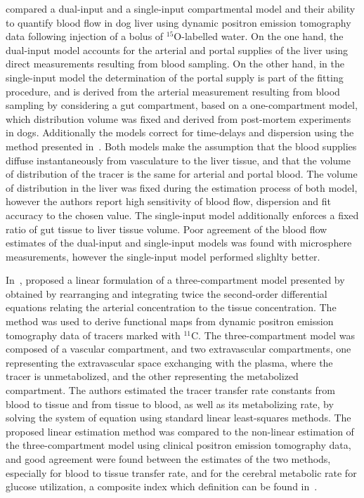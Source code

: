 \citet{Ziegler:1996cs} compared a dual-input and a single-input compartmental model and their ability to quantify blood flow in dog liver using dynamic positron emission tomography data following injection of a bolus of $^{15}$O-labelled water.
On the one hand, the dual-input model accounts for the arterial and portal supplies of the liver using direct measurements resulting from blood sampling.
On the other hand, in the single-input model the determination of the portal supply is part of the fitting procedure, and is derived from the arterial measurement resulting from blood sampling by considering a gut compartment, based on a one-compartment model, which distribution volume was fixed and derived from post-mortem experiments in dogs.
Additionally the models correct for time-delays and dispersion using the method presented in~\cite{Meyer:1989vy}.
Both models make the assumption that the blood supplies diffuse instantaneously from vasculature to the liver tissue, and that the volume of distribution of the tracer is the same for arterial and portal blood.
The volume of distribution in the liver was fixed during the estimation process of both model, however the authors report high sensitivity of blood flow, dispersion and fit accuracy to the chosen value.
The single-input model additionally enforces a fixed ratio of gut tissue to liver tissue volume.
Poor agreement of the blood flow estimates of the dual-input and single-input models was found with microsphere measurements, however the single-input model performed slighlty better.

In~\citeyear{Blomqvist:1984jy}, \citet{Blomqvist:1984jy} proposed a linear formulation of a three-compartment model presented by~\citet{Raichle:1975va} obtained by rearranging and integrating twice the second-order differential equations relating the arterial concentration to the tissue concentration.
The method was used to derive functional maps from dynamic positron emission tomography data of tracers marked with $^{11}$C.
The three-compartment model was composed of a vascular compartment, and two extravascular compartments, one representing the extravascular space exchanging with the plasma, where the tracer is unmetabolized, and the other representing the metabolized compartment.
The authors estimated the tracer transfer rate constants from blood to tissue and from tissue to blood, as well as its metabolizing rate, by solving the system of equation using standard linear least-squares methods.
The proposed linear estimation method was compared to the non-linear estimation of the three-compartment model using clinical positron emission tomography data, and good agreement were found between the estimates of the two methods, especially for blood to tissue transfer rate, and for the cerebral metabolic rate for glucose utilization, a composite index which definition can be found in~\cite{Reivich:1982ir}.


